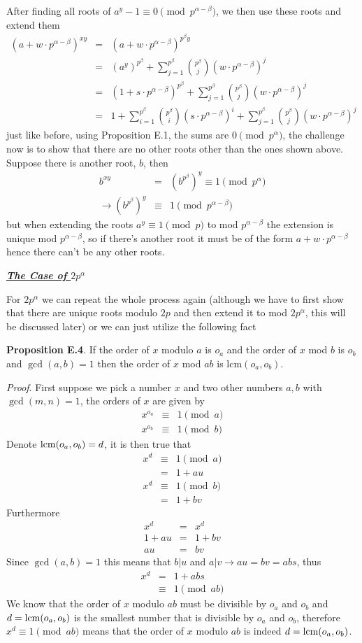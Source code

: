 \documentclass[aps,preprint,preprintnumbers,nofootinbib,showpacs,prd]{revtex4-1}
\newcommand{\nbea}{\begin{eqnarray*}}
\newcommand{\neea}{\end{eqnarray*}}
\begin{document}
After finding all roots of $a^y - 1 \equiv 0 \pmod{p^{\alpha-\beta}}$, we then use these roots and extend them
%
\nbea
(a + w\cdot p^{\alpha-\beta})^{xy} & = & (a + w\cdot p^{\alpha-\beta})^{p^\beta y} \\
& = & (a^y)^{p^\beta} + \sum_{j=1}^{p^\beta} \binom{p^\beta}{j} (w\cdot p^{\alpha-\beta})^j \\
& = & (1 + s\cdot p^{\alpha-\beta})^{p^\beta} + \sum_{j=1}^{p^\beta} \binom{p^\beta}{j} (w\cdot p^{\alpha-\beta})^j \\
& = & 1 + \sum_{i=1}^{p^\beta} \binom{p^\beta}{i} (s\cdot p^{\alpha-\beta})^i + \sum_{j=1}^{p^\beta} \binom{p^\beta}{j} (w\cdot p^{\alpha-\beta})^j
\neea
%
just like before, using Proposition E.1, the sums are $0 \pmod{p^\alpha}$, the challenge now is to show that there are no other roots other than the ones shown above. Suppose there is another root, $b$, then
%
\nbea
b^{xy} & = & \left(b^{p^\beta}\right)^{y} \equiv 1 \pmod{p^\alpha} \\
\to \left(b^{p^\beta}\right)^y & \equiv & 1 \pmod{p^{\alpha-\beta}}
\neea
%
but when extending the roots $a^y \equiv 1 \pmod{p}$ to mod $p^{\alpha-\beta}$ the extension is unique mod $p^{\alpha-\beta}$, so if there's another root it must be of the form $a + w\cdot p^{\alpha-\beta}$ hence there can't be any other roots.

\bigskip
\underline{\textbf{\textit{The Case of $2p^\alpha$}}}
\bigskip

For $2p^\alpha$ we can repeat the whole process again (although we have to first show that there are unique roots modulo $2p$ and then extend it to mod $2p^\alpha$, this will be discussed later) or we can just utilize the following fact 

{\bf Proposition E.4}. If the order of $x$ modulo $a$ is $o_a$ and the order of $x$ mod $b$ is $o_b$ and $\gcd(a,b) = 1$ then the order of $x$ mod $ab$ is lcm$(o_a,o_b)$.

{\it Proof}. First suppose we pick a number $x$ and two other numbers $a,b$ with $\gcd(m,n) = 1$, the orders of $x$ are given by
%
\nbea
x^{o_a} & \equiv & 1 \pmod{a} \\
x^{o_b} & \equiv & 1 \pmod{b}
\neea
%
Denote ${\rm lcm}(o_a,o_b) = d$, it is then true that
%
\nbea
x^d &\equiv & 1 \pmod{a} \\
& = & 1 + au\\
x^d & \equiv & 1 \pmod{b} \\
& = & 1 + bv
\neea
%
Furthermore
%
\nbea
x^d & = & x^d \\
1 + au & = & 1 +bv \\
au & = & bv
\neea
%
Since $\gcd(a,b)=1$ this means that $b|u$ and $a|v \to au=bv = abs$, thus
%
\nbea
x^d & = & 1 + ab s \\
& \equiv & 1 \pmod{ab}
\neea
%
We know that the order of $x$ modulo $ab$ must be divisible by $o_a$ and $o_b$ and $d = {\rm lcm}(o_a,o_b)$ is the smallest number that is divisible by $o_a$ and $o_b$, therefore $x^d \equiv 1 \pmod{ab}$ means that the order of $x$ modulo $ab$ is indeed $d = {\rm lcm}(o_a,o_b)$.
\end{document}
